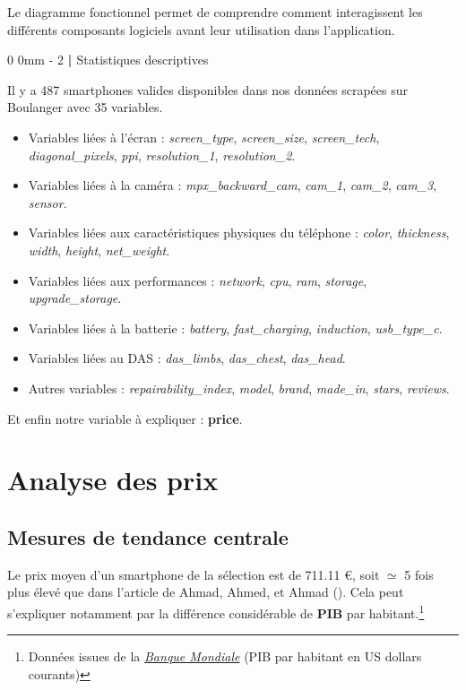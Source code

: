 \documentclass[
  12pt,
]{report}
\makeatletter
\renewcommand{\chapter}{%
    \clearpage %
    \@startsection{chapter}%
    {0} %
    {0mm} %
    {-\baselineskip} %
    {2\baselineskip} %
    {\normalfont\Huge\bfseries | \Huge\bfseries}%
}
\makeatother
\begin{document}
Le diagramme fonctionnel permet de comprendre comment interagissent les
différents composants logiciels avant leur utilisation dans
l'application.

\chapter{Statistiques descriptives}\label{statistiques-descriptives}

Il y a 487 smartphones valides disponibles dans nos données scrapées sur
Boulanger avec 35 variables.

\begin{itemize}
\item
  Variables liées à l'écran : \emph{screen\_type}, \emph{screen\_size},
  \emph{screen\_tech}, \emph{diagonal\_pixels}, \emph{ppi},
  \emph{resolution\_1}, \emph{resolution\_2}.
\item
  Variables liées à la caméra : \emph{mpx\_backward\_cam},
  \emph{cam\_1}, \emph{cam\_2}, \emph{cam\_3}, \emph{sensor}.
\item
  Variables liées aux caractéristiques physiques du téléphone :
  \emph{color}, \emph{thickness}, \emph{width}, \emph{height},
  \emph{net\_weight}.
\item
  Variables liées aux performances : \emph{network}, \emph{cpu},
  \emph{ram}, \emph{storage}, \emph{upgrade\_storage}.
\item
  Variables liées à la batterie : \emph{battery}, \emph{fast\_charging},
  \emph{induction}, \emph{usb\_type\_c}.
\item
  Variables liées au DAS : \emph{das\_limbs}, \emph{das\_chest},
  \emph{das\_head}.
\item
  Autres variables : \emph{repairability\_index}, \emph{model},
  \emph{brand}, \emph{made\_in}, \emph{stars}, \emph{reviews}.
\end{itemize}

Et enfin notre variable à expliquer : \textbf{price}.

\section{Analyse des prix}\label{analyse-des-prix}

\subsection{Mesures de tendance
centrale}\label{mesures-de-tendance-centrale}

Le prix moyen d'un smartphone de la sélection est de 711.11 €, soit
\(\simeq\) 5 fois plus élevé que dans l'article de Ahmad, Ahmed, et
Ahmad (). Cela peut s'expliquer notamment
par la différence considérable de \textbf{PIB} par habitant.\footnote{Données
  issues de la
  \href{https://donnees.banquemondiale.org/indicator/NY.GDP.PCAP.CD?most_recent_year_desc=true}{\emph{Banque
  Mondiale}} (PIB par habitant en US dollars courants)}
\end{document}
